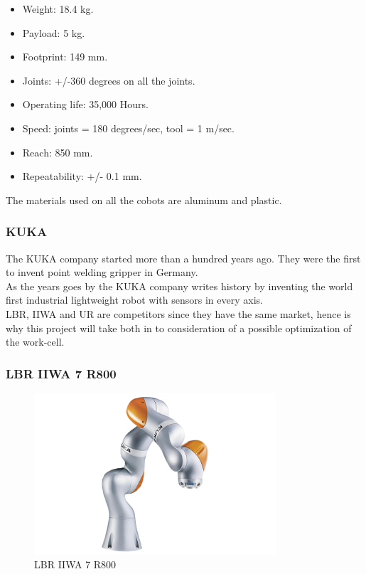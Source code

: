\begin{itemize}
    \item Weight: 18.4 kg.
    \item Payload: 5 kg.
    \item Footprint: 149 mm.
    \item Joints: +/-360 degrees on all the joints.
    \item Operating life: 35,000 Hours.
    \item Speed: joints = 180 degrees/sec, tool = 1 m/sec.
    \item Reach: 850 mm.
    \item Repeatability: +/- 0.1 mm.
\end{itemize}
The materials used on all the cobots are aluminum and plastic\cite{Ur5_about}\cite{UR5_tech}.


\subsubsection{KUKA}

The KUKA company started more than a hundred years ago. They were the first to invent point welding gripper in Germany.\\
As the years goes by the KUKA company writes history by inventing the world first industrial lightweight robot with sensors in every axis.\\

LBR, IIWA and UR are competitors since they have the same market, hence is why this project will take both in to consideration of a possible optimization of the work-cell\cite{KukaHist}.\\


\subsubsection{LBR IIWA 7 R800}
\begin{figure}[h]
    \centering
    \includegraphics[width=9cm]{UR/1502895088_1.png}
    \caption{LBR IIWA 7 R800}
    \label{fig:LBR IIWA}
\end{figure}

